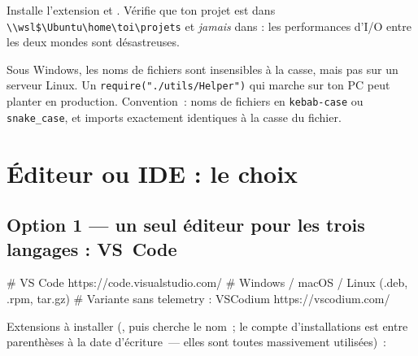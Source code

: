 Installe l'extension 
et .
V\'erifie que ton projet est dans \verb|\\wsl$\Ubuntu\home\toi\projets| et \emph{jamais} dans
 : les performances d'I/O entre les deux mondes sont d\'esastreuses.

\begin{piege}
Sous Windows, les noms de fichiers sont insensibles \`a la casse, mais pas sur un serveur Linux.
Un \verb|require("./utils/Helper")| qui marche sur ton PC peut planter en production.
Convention~: noms de fichiers en \texttt{kebab-case} ou \texttt{snake\_case}, et imports
exactement identiques \`a la casse du fichier.
\end{piege}

\section{\'Editeur ou IDE : le choix}

\subsection{Option 1 --- un seul \'editeur pour les trois langages : VS~Code}

\begin{terminal}
# VS Code
https://code.visualstudio.com/                # Windows / macOS / Linux (.deb, .rpm, tar.gz)
# Variante sans telemetry : VSCodium
https://vscodium.com/
\end{terminal}

Extensions \`a installer (, puis cherche le nom~; le compte d'installations est
entre parenth\`eses \`a la date d'\'ecriture~--- elles sont toutes massivement utilis\'ees)~:

